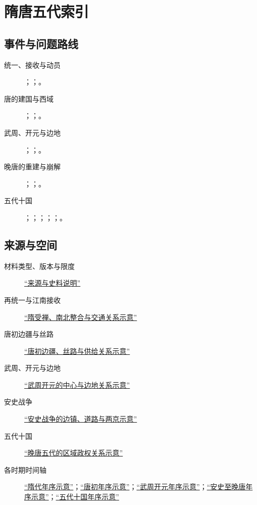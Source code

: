 \chapter{隋唐五代索引}
\label{app:index}

\section{事件与问题路线}
\begin{description}
  \item[统一、接收与动员] ；；。
  \item[唐的建国与西域] ；；。
  \item[武周、开元与边地] ；；。
  \item[晚唐的重建与崩解] ；；。
  \item[五代十国] ；；；；；。
\end{description}

\section{来源与空间}
\begin{description}
  \item[材料类型、版本与限度] \hyperref[app:sources]{“来源与史料说明”}
  \item[再统一与江南接收] \hyperref[fig:vol03:sui:sui-reunification]{“隋受禅、南北整合与交通关系示意”}
  \item[唐初边疆与丝路] \hyperref[fig:vol03:early-tang:tang-frontiers-silk-road]{“唐初边疆、丝路与供给关系示意”}
  \item[武周、开元与边地] \hyperref[fig:vol03:wu-zhou-xuanzong:wu-zhou-kaiyuan-centers-frontiers]{“武周开元的中心与边地关系示意”}
  \item[安史战争] \hyperref[fig:vol03:an-lushan-late-tang:tang-frontiers-an-shi]{“安史战争的边镇、道路与两京示意”}
  \item[五代十国] \hyperref[fig:vol03:five-dynasties-ten-kingdoms:late-tang-five-dynasties-regional-order]{“晚唐五代的区域政权关系示意”}
  \item[各时期时间轴] \hyperref[fig:vol03:sui:chronology]{“隋代年序示意”}；\hyperref[fig:vol03:early-tang:chronology]{“唐初年序示意”}；\hyperref[fig:vol03:wu-zhou-xuanzong:chronology]{“武周开元年序示意”}；\hyperref[fig:vol03:an-lushan-late-tang:chronology]{“安史至晚唐年序示意”}；\hyperref[fig:vol03:five-dynasties-ten-kingdoms:chronology]{“五代十国年序示意”}
\end{description}


